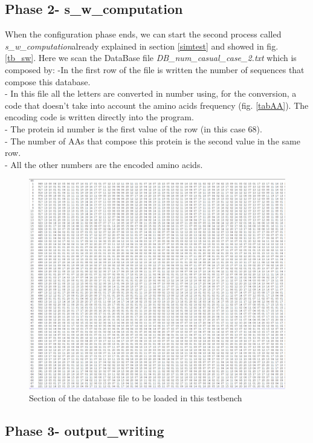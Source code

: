 \subsection{Phase 2- s\_w\_computation}
When the configuration phase ends, we can start the second process called \textit{s\_w\_computation}already explained in section \ref{simtest} and showed in fig. \ref{tb_sw}.
Here we scan the DataBase file \textit{DB\_num\_casual\_case\_2.txt} which is composed by:
 -In the first row of the file is written the number of sequences that compose this database.\\
 - In this file all the letters are converted in number using, for the conversion, a code that doesn't  take into account   the amino acids frequency (fig. \ref{tabAA}).
  The encoding code is written directly into the program.\\
   - The protein id number is the first value of the row (in this case 68). \\
   - The number of AAs that compose this protein is the second value in the same row.\\
    - All the other numbers are the encoded amino acids.
\begin{figure}[h!]
	\centering
	\includegraphics[width=\textwidth]{imm/sw/db.png}
	\caption{Section of the database file to be loaded in this testbench} 
	\label{db}
\end{figure}
\clearpage
\subsection{Phase 3- output\_writing}